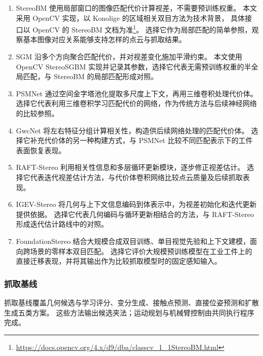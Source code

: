 \documentclass[UTF8,fontset=fandol,a4paper,11pt]{ctexart}
\begin{document}
\begin{enumerate}
\item StereoBM 使用局部窗口的图像匹配代价计算视差，不需要预训练权重。
本文采用 OpenCV 实现，以 Konolige 的区域相关双目方法为技术背景\cite{konolige1998}，
具体接口以 OpenCV 的 StereoBM 文档为准\footnote{\url{https://docs.opencv.org/4.x/d9/dba/classcv_1_1StereoBM.html}}。
选择它作为局部匹配的简单参照，观察基本图像对应关系能够支持怎样的点云与抓取结果。
\item SGM 沿多个方向聚合匹配代价，并对视差变化施加平滑约束\cite{hirschmuller2008}。
本文使用 OpenCV StereoSGBM 实现并记录其参数，选择它代表无需预训练权重的半全局匹配，与 StereoBM 的局部匹配形成对照。
\item PSMNet 通过空间金字塔池化提取多尺度上下文，再用三维卷积处理代价体\cite{chang2018}。
选择它代表利用三维卷积学习匹配代价的网络，作为传统方法与后续神经网络的比较参照。
\item GwcNet 将左右特征分组计算相关性，构造供后续网络处理的匹配代价体\cite{guo2019}。
选择它补充代价体的另一种构建方式，与 PSMNet 比较不同匹配表示下的工件表面恢复表现。
\item RAFT-Stereo 利用相关性信息和多层循环更新模块，逐步修正视差估计\cite{lipson2021}。
选择它代表迭代视差估计方法，与代价体卷积网络比较点云质量及后续抓取表现。
\item IGEV-Stereo 将几何与上下文信息编码到体表示中，为视差初始化和迭代更新提供依据\cite{xu2023}。
选择它代表几何编码与循环更新相结合的方法，与 RAFT-Stereo 形成迭代估计路线中的对照。
\item FoundationStereo 结合大规模合成双目训练、单目视觉先验和上下文建模，面向跨场景的零样本双目匹配\cite{wen2025}。
选择它评价大规模预训练模型在工业工件上的直接迁移表现，并将其输出作为比较抓取模型时的固定感知输入。
\end{enumerate}

\subsubsection{抓取基线}

抓取基线覆盖几何候选与学习评分、变分生成、接触点预测、直接位姿预测和扩散生成五类方案。
这些方法输出候选夹法；运动规划与机械臂控制由共同执行程序完成。
\end{document}
